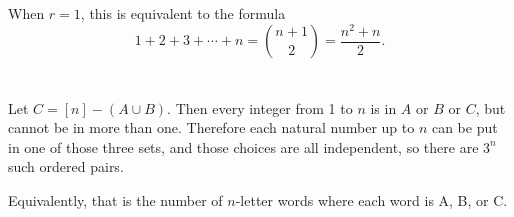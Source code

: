 \documentclass[12pt]{article}
\begin{document}
\section{}
\noindent{}\bigskip\par
When $r=1$, this is equivalent to the formula
\[ 1+2+3+\cdots +n = \binom{n+1}{2} = \frac{n^2+n}{2}. \]


\section{}
\noindent{}\bigskip\par
Let $C=[n]-(A \cup B)$. Then every integer from 1 to $n$ is in $A$ or $B$ or $C$, but cannot be in more than one. Therefore each natural number up to $n$ can be put in one of those three sets, and those choices are all independent, so there are $3^n$ such ordered pairs.
\par
Equivalently, that is the number of $n$-letter words where each word is A, B, or C.

\section{}
\noindent{}\bigskip\par
\end{document}
